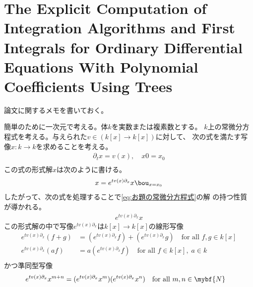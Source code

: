 \section{The Explicit Computation of Integration Algorithms and First Integrals for Ordinary Differential Equations With Polynomial Coefficients Using Trees}\label{s1:The Explicit Computation of Integration Algorithms and First Integrals for Ordinary Differential Equations With Polynomial Coefficients Using Trees} %
	論文\cite{url:grossman:explicit}に関するメモを書いておく。

	簡単のために一次元で考える。体$k$を実数または複素数とする。
	$k$上の常微分方程式を考える。与えられた$v\in(k[x]\to k[x])$に対して、
	次の式を満たす写像$x:k\to k$を求めることを考える。
	\begin{equation}\label{eq:お題の常微分方程式}\begin{split} %
		\partial_tx = v(x),\quad x0=x_0 \\
	\end{split}\end{equation} %
	この式の形式解$x$は次のように書ける。
	\begin{equation}\begin{split} %
		x = e^{tv(x)\partial_x}x\bou_{x=x_0}
	\end{split}\end{equation} %
	したがって、次の式を処理することで\eqref{eq:お題の常微分方程式}の解
	の持つ性質が導かれる。
	\begin{equation}\label{eq:常微分方程式の形式解}\begin{split} %
		e^{tv(x)\partial_x}x
	\end{split}\end{equation} %
	この形式解の中で写像$e^{tv(x)\partial_x}$は$k[x]\to k[x]$の線形写像
	\begin{equation}\begin{split} %
		e^{tv(x)\partial_x}(f+g) 
		&= (e^{tv(x)\partial_x}f) + (e^{tv(x)\partial_x}g) \quad\text{for all }f,g\in k[x] \\
		e^{tv(x)\partial_x}(af) &= a(e^{tv(x)\partial_x}f) \quad\text{for all }f\in k[x],\;a\in k \\
	\end{split}\end{equation} %
	かつ準同型写像
	\begin{equation}\begin{split} %
		e^{tv(x)\partial_x}x^{m+n} 
		&= (e^{tv(x)\partial_x}x^m)(e^{tv(x)\partial_x}x^n) \quad\text{for all }m,n\in \mybf{N}
	\end{split}\end{equation} %
